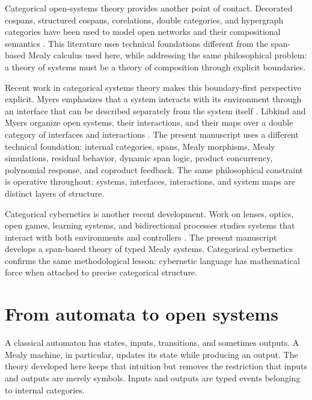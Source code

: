 Categorical open-systems theory provides another point of contact.  Decorated
cospans, structured cospans, corelations, double categories, and hypergraph
categories have been used to model open networks and their compositional
semantics
\cite{Fong2015DecoratedCospans,Courser2020OpenSystemsDoubleCategories}.  This
literature uses technical foundations different from the span-based Mealy
calculus used here, while addressing the same philosophical problem: a theory
of systems must be a theory of composition through explicit boundaries.

Recent work in categorical systems theory makes this boundary-first
perspective explicit.  Myers emphasizes that a system interacts with its
environment through an interface that can be described separately from the
system itself \cite{MyersCategoricalSystemsTheory}.  Libkind and Myers
organize open systems, their interactions, and their maps over a double
category of interfaces and interactions
\cite{LibkindMyers2025DoubleSystems}.  The present manuscript uses a
different technical foundation: internal categories, spans, Mealy morphisms,
Mealy simulations, residual behavior, dynamic span logic, product
concurrency, polynomial response, and coproduct feedback.  The same
philosophical constraint is operative throughout: systems, interfaces,
interactions, and system maps are distinct layers of structure.

Categorical cybernetics is another recent development.  Work on lenses,
optics, open games, learning systems, and bidirectional processes studies
systems that interact with both environments and controllers
\cite{CapucciGavranovicHedgesRischel2021CategoricalCybernetics}.  The present
manuscript develops a span-based theory of typed Mealy systems.  Categorical
cybernetics confirms the same methodological lesson: cybernetic language has
mathematical force when attached to precise categorical structure.

\section{From automata to open systems}
\label{sec:from-automata-to-open-systems}

A classical automaton has states, inputs, transitions, and sometimes outputs.
A Mealy machine, in particular, updates its state while producing an output.
The theory developed here keeps that intuition but removes the restriction
that inputs and outputs are merely symbols.  Inputs and outputs are typed
events belonging to internal categories.

